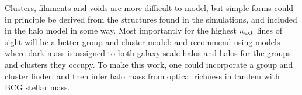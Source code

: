 \documentclass[useAMS,usenatbib,a4paper]{mn2e}
\begin{document}
Clusters, filaments and voids are more difficult to model, but simple forms
could in principle be derived from the structures found in the simulations,
and included in the halo model in some way.  Most importantly for the highest
$\kappa_{\rm ext}$ lines of sight will be a better group and cluster model:
\citet{MomchevaEtal2006} and  \citet{WongEtal2011} recommend using models
where dark mass is assigned to both galaxy-scale halos and halos for the
groups and clusters they occupy. To make this work, one could incorporate a
group and cluster finder, and then infer halo mass from optical richness
\citep[\eg][]{MaxBCG} in tandem with BCG stellar mass. 

% 
\end{document}
